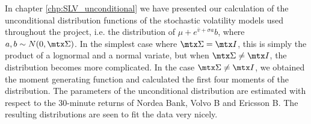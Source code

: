 In chapter \ref{chp:SLV_unconditional} we have presented our
calculation of the unconditional distribution functions of the
stochastic volatility models used throughout the project, i.e. the
distribution of $\mu + e^{\bar{v} + \sigma a}b$, where $a, b \sim N(0,
\mtx \Sigma)$. In the simplest case where $\mtx \Sigma = \mtx I$, this
is simply the product of a lognormal and a normal variate, but when
$\mtx \Sigma \neq \mtx I$, the distribution becomes more
complicated. In the case $\mtx \Sigma \neq \mtx I$, we obtained the
moment generating function and calculated the first four moments of
the distribution. The parameters of the unconditional distribution are
estimated with respect to the 30-minute returns of Nordea Bank, Volvo
B and Ericsson B. The resulting distributions are seen to fit the data
very nicely.
